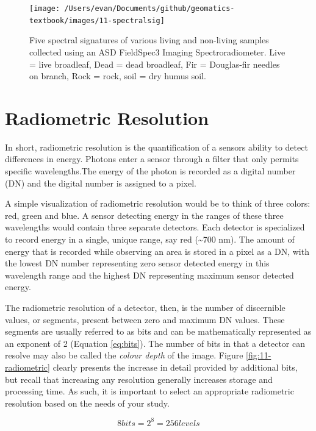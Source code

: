 \documentclass[
]{book}
\begin{document}
\begin{figure}
\texttt{[image: /Users/evan/Documents/github/geomatics-textbook/images/11-spectralsig]} \caption{Five spectral signatures of various living and non-living samples collected using an ASD FieldSpec3 Imaging Spectroradiometer. Live = live broadleaf, Dead = dead broadleaf, Fir = Douglas-fir needles on branch, Rock = rock, soil = dry humus soil.}\label{fig:11-specsig}
\end{figure}

\hypertarget{radiometric-resolution}{%
\section{Radiometric Resolution}\label{radiometric-resolution}}

In short, radiometric resolution is the quantification of a sensors
ability to detect differences in energy. Photons enter a sensor
through a filter that only permits specific wavelengths.The energy
of the photon is recorded as a digital number (DN) and the digital
number is assigned to a pixel.

A simple visualization of radiometric resolution would be to think of
three colors: red, green and blue. A sensor
detecting energy in the ranges of these three wavelengths would
contain three separate detectors. Each detector is specialized to record
energy in a single, unique range, say red (\textasciitilde700 nm). The amount of
energy that is recorded while observing an area is stored in a pixel
as a DN, with the lowest DN number representing zero sensor detected
energy in this wavelength range and the highest DN representing
maximum sensor detected energy.

The radiometric resolution of a detector, then, is the number of
discernible values, or segments, present between zero and maximum DN
values. These segments are usually referred to as bits and can be
mathematically represented as an exponent of 2 (Equation
\eqref{eq:bits}). The number of bits in that a detector can resolve may
also be called the \emph{colour depth} of the image. Figure
\ref{fig:11-radiometric} clearly presents the increase in detail
provided by additional bits, but recall that increasing any resolution
generally increases storage and processing time. As such, it is
important to select an appropriate radiometric resolution based on the
needs of your study.

\begin{equation}
8 bits = 2^8 = 256 levels
\label{eq:bits}
\end{equation}
\end{document}
